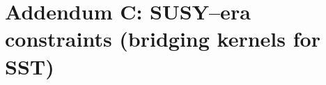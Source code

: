 \documentclass[11pt]{article}
\begin{document}
  \titlepageOpen

  \begin{abstract}


  \end{abstract}

  \titlepageClose
  \fi

  \ifdefined\standalonechapter
  \section{\papertitle}
  \else
  \fi


  \section*{Addendum C: SUSY--era constraints (bridging kernels for SST)}
\end{document}
